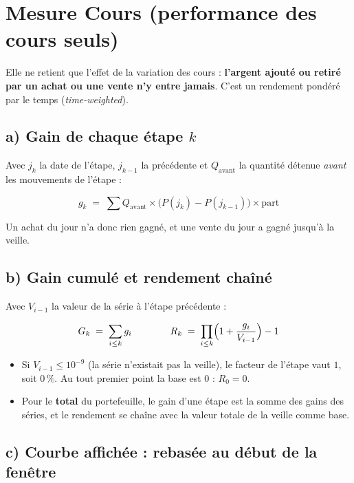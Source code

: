 \documentclass[11pt,a4paper]{article}
\newcommand{\avant}{\mathrm{avant}}
\begin{document}
\section{Mesure \og Cours \fg{} (performance des cours seuls)}

Elle ne retient que l'effet de la variation des cours : \textbf{l'argent ajouté ou retiré par un achat ou une vente
n'y entre jamais}. C'est un rendement pondéré par le temps (\emph{time-weighted}).

\subsection*{a) Gain de chaque étape $k$}

Avec $j_k$ la date de l'étape, $j_{k-1}$ la précédente et $Q_{\avant}$ la quantité détenue \emph{avant} les
mouvements de l'étape :

\begin{formules}
\[
\boxed{\;g_k\;=\;\sum Q_{\avant}\times\bigl(P(j_k)-P(j_{k-1})\bigr)\times \mathrm{part}\;}
\]
\end{formules}

Un achat du jour n'a donc rien gagné, et une vente du jour a gagné jusqu'à la veille.

\subsection*{b) Gain cumulé et rendement chaîné}

Avec $V_{i-1}$ la valeur de la série à l'étape précédente :

\begin{formules}
\[
G_k\;=\;\sum_{i\le k} g_i
\qquad\qquad
R_k\;=\;\prod_{i\le k}\Bigl(1+\frac{g_i}{V_{i-1}}\Bigr)-1
\]
\end{formules}

\begin{itemize}
  \item Si $V_{i-1}\le 10^{-9}$ (la série n'existait pas la veille), le facteur de l'étape vaut $1$, soit $0\,\%$.
        Au tout premier point la base est $0$ : $R_0=0$.
  \item Pour le \textbf{total} du portefeuille, le gain d'une étape est la somme des gains des séries, et le
        rendement se chaîne avec la valeur totale de la veille comme base.
\end{itemize}

\subsection*{c) Courbe affichée : rebasée au début de la fenêtre}
\end{document}
